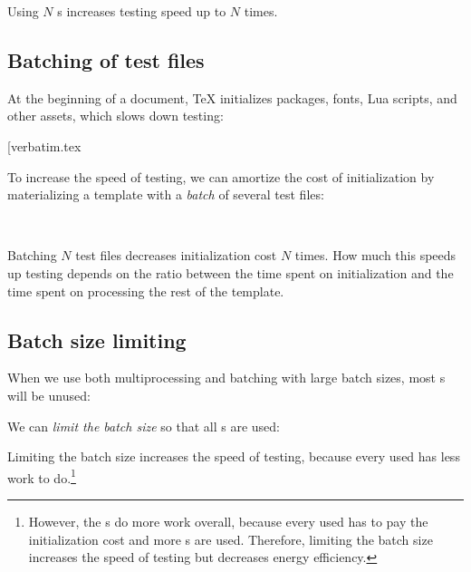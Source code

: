 \documentclass[final]{ltugboat}
\begin{document}
\smallskip
\noindent
\begingroup
\centering

\par
\endgroup

\smallskip
\noindent
Using $N$ s increases testing speed up to $N$ times.

\subsection{Batching of test files}
\label{sec:batching-of-test-files}
At the beginning of a document, \TeX{} initializes packages, fonts, Lua scripts, and other assets, which slows down testing:

\smallskip
\noindent
\example*[{verbatim.tex}

\smallskip

To increase the speed of testing, we can amortize the cost of initialization by materializing a template with a \emph{batch} of several test files:

\medskip
\noindent
{} \\

\smallskip
\noindent
Batching $N$ test files decreases initialization cost $N$ times. How much this speeds up testing depends on the ratio between the time spent on initialization and the time spent on processing the rest of the template.

\subsection{Batch size limiting}

When we use both multiprocessing and batching with large batch sizes, most s will be unused:

\smallskip
\noindent
\begingroup
\centering

\par
\endgroup

\smallskip
\noindent
We can \emph{limit the batch size} so that all s are used:

\medskip
\noindent
\begingroup
\centering

\par
\endgroup

\smallskip
\noindent
{}
Limiting the batch size increases the speed of testing, because every used  has less work to do.\footnote{However, the s do more work overall, because every used  has to pay the initialization cost and more s are used. Therefore, limiting the batch size increases the speed of testing but decreases energy efficiency.}
\end{document}

